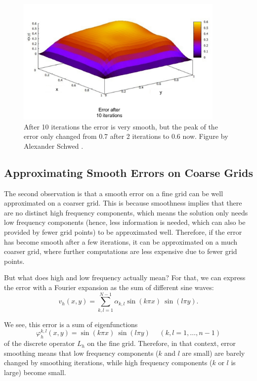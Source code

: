 \begin{figure}[tbp]
	\centering
	\includegraphics[width=0.9\textwidth]{chapters/chapter02/mg_error_smoothing_10}
	\caption{After 10 iterations the error is very smooth, but the peak of the error only changed from 0.7 after 2 iterations to 0.6 now. Figure by Alexander Schwed \cite{schwed}.}
	\label{fig:mg_error_smoothing_10}
\end{figure}


\subsection{Approximating Smooth Errors on Coarse Grids}
The second observation is that a smooth error on a fine grid can be well approximated on a coarser grid. This is because smoothness implies that there are no distinct high frequency components, which means the solution only needs low frequency components (hence, less information is needed, which can also be provided by fewer grid points) to be approximated well. Therefore, if the error has become smooth after a few iterations, it can be approximated on a much coarser grid, where further computations are less expensive due to fewer grid points.

But what does high and low frequency actually mean? For that, we can express the error with a Fourier expansion as the sum of different sine waves:
\begin{equation}
v_h(x,y) = \sum_{k,l = 1}^{N-1} \alpha_{k,l} \sin (k \pi x)~ \sin ( l \pi y).
\end{equation}

We see, this error is a sum of eigenfunctions 
\begin{equation}
\varphi_h ^{k,l}(x,y) = \sin (k \pi x)~ \sin ( l \pi y) \text{~~~~}(k,l = 1, \hdots, n-1)
\end{equation}
of the discrete operator $L_h$ on the fine grid. Therefore, in that context, error smoothing means that low frequency components ($k$ and $l$ are small) are barely changed by smoothing iterations, while high frequency components ($k$ or $l$ is large) become small.

